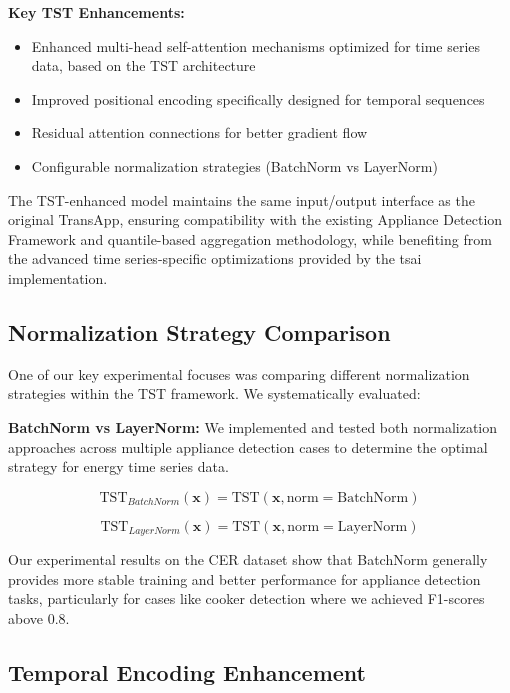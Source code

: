 \documentclass[conference]{IEEEtran}
\begin{document}
\textbf{Key TST Enhancements:}
\begin{itemize}
    \item Enhanced multi-head self-attention mechanisms optimized for time series data, based on the TST architecture \cite{tst2022tsai}
    \item Improved positional encoding specifically designed for temporal sequences
    \item Residual attention connections for better gradient flow
    \item Configurable normalization strategies (BatchNorm vs LayerNorm)
\end{itemize}

The TST-enhanced model maintains the same input/output interface as the original TransApp, ensuring compatibility with the existing Appliance Detection Framework and quantile-based aggregation methodology, while benefiting from the advanced time series-specific optimizations provided by the tsai implementation.

\subsection{Normalization Strategy Comparison}

One of our key experimental focuses was comparing different normalization strategies within the TST framework. We systematically evaluated:

\textbf{BatchNorm vs LayerNorm:} We implemented and tested both normalization approaches across multiple appliance detection cases to determine the optimal strategy for energy time series data.

\begin{equation}
\text{TST}_{BatchNorm}(\mathbf{x}) = \text{TST}(\mathbf{x}, \text{norm}=\text{BatchNorm})
\end{equation}

\begin{equation}
\text{TST}_{LayerNorm}(\mathbf{x}) = \text{TST}(\mathbf{x}, \text{norm}=\text{LayerNorm})
\end{equation}

Our experimental results on the CER dataset show that BatchNorm generally provides more stable training and better performance for appliance detection tasks, particularly for cases like cooker detection where we achieved F1-scores above 0.8.

\subsection{Temporal Encoding Enhancement}
\end{document}
